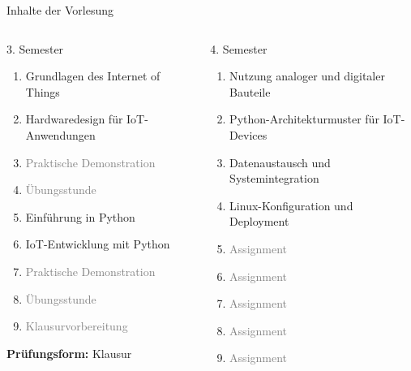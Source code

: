 {
\footnotesize
\begin{frame}{Inhalte der Vorlesung}
        \begin{columns}
            \begin{column}[T]{.5\textwidth}
                \begin{block}{3. Semester}
                    \medskip

                    \begin{enumerate}
                        \item Grundlagen des Internet of Things
                        \item Hardwaredesign für IoT-Anwendungen
                        \item \textcolor{gray}{Praktische Demonstration}
                        \item \textcolor{gray}{Übungsstunde}
                        \item Einführung in Python
                        \item IoT-Entwicklung mit Python
                        \item \textcolor{gray}{Praktische Demonstration}
                        \item \textcolor{gray}{Übungsstunde}
                        \item \textcolor{gray}{Klausurvorbereitung}
                    \end{enumerate}

                    \medskip
                    \textbf{Prüfungsform:} Klausur
                \end{block}
            \end{column}
            \begin{column}[T]{.5\textwidth}
                \begin{block}{4. Semester}
                    \medskip

                    \begin{enumerate}
                        \item Nutzung analoger und digitaler Bauteile
                        \item Python-Architekturmuster für IoT-Devices
                        \item Datenaustausch und Systemintegration
                        \item Linux-Konfiguration und Deployment
                        \item \textcolor{gray}{Assignment}
                        \item \textcolor{gray}{Assignment}
                        \item \textcolor{gray}{Assignment}
                        \item \textcolor{gray}{Assignment}
                        \item \textcolor{gray}{Assignment}
                    \end{enumerate}


\end{block}
\end{column}
\end{columns}
\end{frame}}
